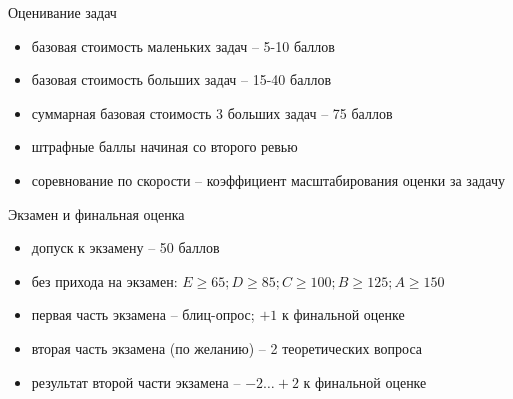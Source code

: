 \documentclass[unknownkeysallowed,xcolor=table]{beamer}
\begin{document}
\begin{frame}{Оценивание задач}
  \begin{itemize}
    \item базовая стоимость маленьких задач -- 5-10 баллов \vspace{1em}
    \item базовая стоимость больших задач -- 15-40 баллов \vspace{1em}
    \item суммарная базовая стоимость 3 больших задач -- 75 баллов \vspace{1em}
    \item штрафные баллы начиная со второго ревью \vspace{1em}
    \item соревнование по скорости -- коэффициент масштабирования оценки за задачу
  \end{itemize}
\end{frame}

\begin{frame}{Экзамен и финальная оценка}
  \begin{itemize}
    \item допуск к экзамену -- 50 баллов
    \item без прихода на экзамен: $E \geq 65; D \geq 85; C \geq 100; B \geq 125; A \geq 150$
    \item первая часть экзамена -- блиц-опрос; $+ 1$ к финальной оценке
    \item вторая часть экзамена (по желанию) -- 2 теоретических вопроса
    \item результат второй части экзамена -- $-2 \dotso +2$ к финальной оценке
  \end{itemize}
\end{frame}
\end{document}
